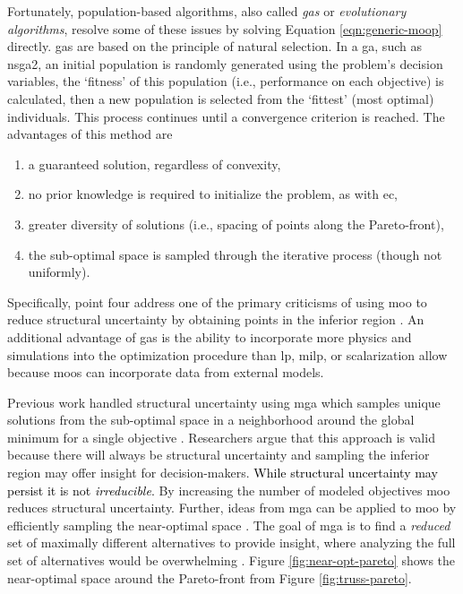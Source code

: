 Fortunately, population-based algorithms, also called \textit{\acp{ga}} or
\textit{evolutionary algorithms}, resolve some of these issues by solving
Equation \ref{eqn:generic-moop} directly. \Acp{ga} are based on the principle of
natural selection. In a \ac{ga}, such as \ac{nsga2}, an initial population is
randomly generated using the problem's decision variables, the `fitness' of this
population (i.e., performance on each objective) is calculated, then a new
population is selected from the `fittest' (most optimal) individuals. This
process continues until a convergence criterion is reached. The advantages of
this method are
\begin{enumerate}
    \item a guaranteed solution, regardless of convexity,
    \item no prior knowledge is required to initialize the problem, as with
    \ac{ec},
    \item greater diversity of solutions (i.e., spacing of points along the
    Pareto-front),
    \item the sub-optimal space is sampled through the iterative process (though
    not uniformly).
\end{enumerate}
Specifically, point four address one of the primary criticisms of using \ac{moo}
to reduce structural uncertainty by obtaining points in the inferior region
\cite{loughlin_genetic_2001,zechman_evolutionary_2004,
zechman_evolutionary_2013}. An additional advantage of \acp{ga} is the ability
to incorporate more physics and simulations into the optimization procedure than
\ac{lp}, \ac{milp}, or scalarization allow \cite{loughlin_genetic_2001} because
\acp{moo} can incorporate data from external models. 

Previous work handled structural uncertainty using \ac{mga} which samples unique
solutions from the sub-optimal space in a neighborhood around the global minimum
for a single objective \cite{decarolis_using_2011}. Researchers argue that this
approach is valid because there will always be structural uncertainty and
sampling the inferior region may offer insight for decision-makers.
\textcolor{black}{While structural uncertainty may persist it is not
\textit{irreducible}.} By increasing the number of modeled objectives \ac{moo}
reduces structural uncertainty. Further, ideas from \ac{mga} can be applied to
\ac{moo} by efficiently sampling the near-optimal space
\cite{loughlin_genetic_2001,
zechman_evolutionary_2004,zechman_evolutionary_2013,pajares_comparison_2021}.
The goal of \ac{mga} is to find a \textit{reduced} set of maximally different
alternatives to provide insight, where analyzing the full set of alternatives
would be overwhelming \cite{decarolis_using_2011, pajares_comparison_2021}.
Figure \ref{fig:near-opt-pareto} shows the near-optimal space around the
Pareto-front from Figure \ref{fig:truss-pareto}.

